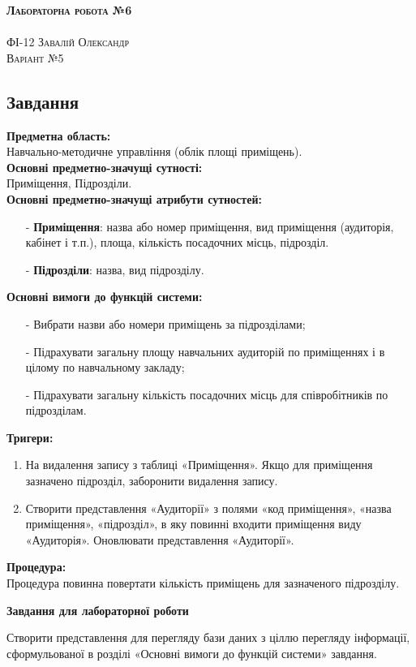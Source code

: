 \documentclass[a4paper,12pt]{article}
\begin{document}
	
	\begin{center}
		{\Large \bfseries \textsc{Лабораторна робота №6}}\\
		\hrulefill\\
		\Large \textsc{ФІ-12 Завалій Олександр\\ Варіант №5}
	\end{center}
	\begin{center}
		\section*{\bfseries{Завдання}}
	\end{center} 
	\textbf{Предметна область:} \\
	Навчально-методичне управління (облік площі приміщень). \\
	\textbf{Основні предметно-значущі сутності:} \\
	Приміщення, Підрозділи. \\
	\textbf{Основні предметно-значущі атрибути сутностей:}
	\begin{enumerate}
		\item[-] \textbf{Приміщення}: назва або номер приміщення, вид приміщення (аудиторія, кабінет і т.п.), площа, кількість посадочних місць, підрозділ. 
		\item[-] \textbf{Підрозділи}: назва, вид підрозділу.
	\end{enumerate}
	\textbf{Основні вимоги до функцій системи:}
	\begin{enumerate}
		\item[-] Вибрати назви або номери приміщень за підрозділами;
		\item[-] Підрахувати загальну площу навчальних аудиторій по приміщеннях і в цілому по навчальному закладу;
		\item[-] Підрахувати загальну кількість посадочних місць для співробітників по підрозділам.
	\end{enumerate}
	\textbf{Тригери:}
	\begin{enumerate}
		\item На видалення запису з таблиці «Приміщення». Якщо для приміщення зазначено підрозділ, заборонити видалення запису.
		\item Створити представлення «Аудиторії» з полями «код приміщення», «назва приміщення», «підрозділ», в яку повинні входити приміщення виду «Аудиторія». Оновлювати представлення «Аудиторії».
	\end{enumerate}
	\textbf{Процедура:}\\
	Процедура повинна повертати кількість приміщень для зазначеного підрозділу. \\
	\begin{center}
		\textbf{Завдання для лабораторної роботи}
	\end{center}
    Створити представлення для перегляду бази даних з ціллю перегляду інформації,
	сформульованої в розділі «Основні вимоги до функцій системи» завдання.
\end{document}
